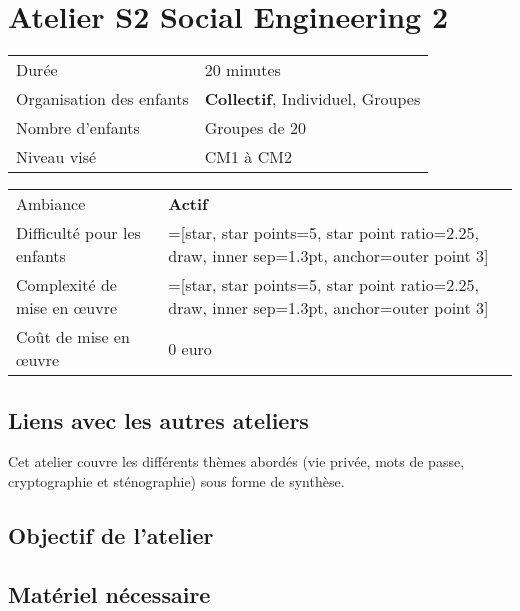 \documentclass[a4paper]{article}
\newcommand\score[2]{%
  \pgfmathsetmacro\pgfxa{#1 + 1}%
  \tikzstyle{scorestars}=[star, star points=5, star point ratio=2.25, draw, inner sep=1.3pt, anchor=outer point 3]%
  \begin{tikzpicture}[baseline]
    \foreach \i in {1, ..., #2} {
      \pgfmathparse{\i<=#1 ? "yellow" : "gray"}
      \edef\starcolor{\pgfmathresult}
      \draw (\i*1.75ex, 0) node[name=star\i, scorestars, fill=\starcolor]  {};
   }
  \end{tikzpicture}%
}
\begin{document}
 
\section{Atelier S2 \hfill Social Engineering 2}

{
\setlength\arrayrulewidth{2pt}

\begin{minipage}{.55\textwidth}
  \begin{tabularx}{\textwidth}{|l|X|}
    \hline
    Durée                    & 20 minutes \\
    Organisation des enfants & {\bf Collectif}, Individuel, Groupes \\
    Nombre d'enfants         & Groupes de 20 \\
    Niveau visé              & CM1 à CM2 \\
    \hline
  \end{tabularx}
\end{minipage}
\begin{minipage}{.45\textwidth}
  \begin{tabularx}{\textwidth}{|l|X|}
    \hline
    Ambiance                       & {\bf Actif} \\
    Difficulté pour les enfants    & \score{2}{5} \\
    Complexité de mise en \oe uvre & \score{2}{5} \\
    Coût de mise en \oe uvre       & 0 euro \\
    \hline
  \end{tabularx}
\end{minipage}
}

\subsection{Liens avec les autres ateliers}
 
Cet atelier couvre les différents thèmes abordés (vie privée, mots de passe, cryptographie et sténographie) sous forme de synthèse.

\subsection{Objectif de l'atelier}










\subsection{Matériel nécessaire}
\end{document}
